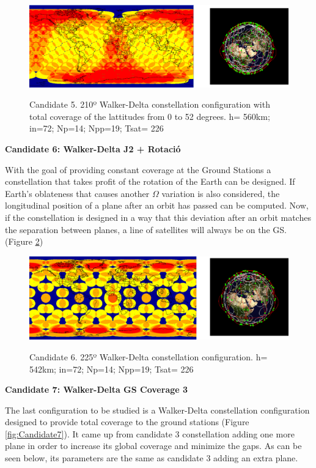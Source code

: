 \begin{figure}%
	\centering
	\includegraphics[width=1\textwidth]{Candidate5.png}\\
	\caption{Candidate 5. 210º Walker-Delta constellation configuration with total coverage of the lattitudes from 0 to 52 degrees.
			 h= 560km; in=72; Np=14; Npp=19; Tsat= 226} 
	\label{fig:Candidate5}
\end{figure}


\textbf{Candidate 6: Walker-Delta J2 + Rotació}

With the goal of providing constant coverage at the Ground Stations a constellation that takes profit of the rotation of the Earth can be designed. If Earth's oblateness that causes another $\Omega$ variation  is also considered, the longitudinal position of a plane after an orbit has passed can be computed. Now, if the constellation is designed in a way that this deviation after an orbit matches the separation between planes, a line of satellites will always be on the GS. (Figure \ref{fig:Candidate6})

\begin{figure}%
	\centering
	\includegraphics[width=1\textwidth]{Candidate6.png}\\
	\caption{Candidate 6. 225º Walker-Delta constellation configuration. h= 542km; in=72; Np=14; Npp=19; Tsat= 226}
	\label{fig:Candidate6}
\end{figure}

\textbf{Candidate 7: Walker-Delta GS Coverage 3}

The last configuration to be studied is a Walker-Delta constellation configuration designed to provide total coverage to the ground stations (Figure \ref{fig:Candidate7}). It came up from candidate 3 constellation adding one more plane in order to increase its global coverage and minimize the gaps. As can be seen below, its parameters are the same as candidate 3 adding an extra plane.

